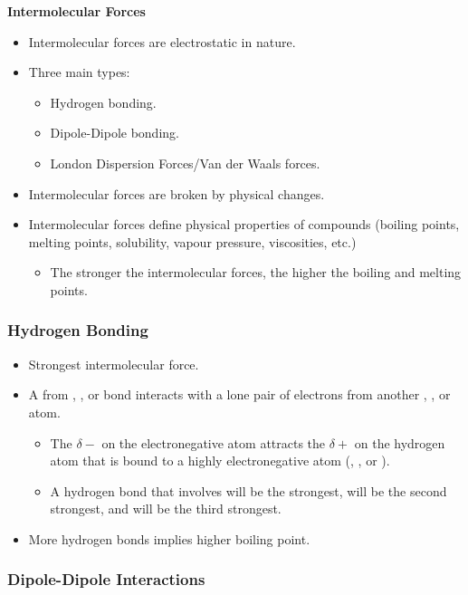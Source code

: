 \documentclass{article}
\begin{document}
\textbf{Intermolecular Forces}

\begin{itemize}
    \item Intermolecular forces are electrostatic in nature.
    \item Three main types:
    \begin{itemize}
        \item Hydrogen bonding.
        \item Dipole-Dipole bonding.
        \item London Dispersion Forces/Van der Waals forces.
    \end{itemize}
    \item Intermolecular forces are broken by physical changes.
    \item Intermolecular forces define physical properties of compounds (boiling points, melting points, solubility, vapour pressure, viscosities, etc.)
    \begin{itemize}
        \item The stronger the intermolecular forces, the higher the boiling and melting points.
    \end{itemize}
\end{itemize}

\subsubsection{Hydrogen Bonding}

\begin{itemize}
    \item Strongest intermolecular force.
    \item A  from , , or  bond interacts with a lone pair of electrons from another , , or  atom. 
    \begin{itemize}
        \item The $\delta-$ on the electronegative atom attracts the $\delta+$ on the hydrogen atom that is bound to a highly electronegative atom (, , or ).
        \item A hydrogen bond that involves  will be the strongest,  will be the second strongest, and  will be the third strongest.
    \end{itemize}
    \item More hydrogen bonds implies higher boiling point.
\end{itemize}

\subsubsection{Dipole-Dipole Interactions}
\end{document}
